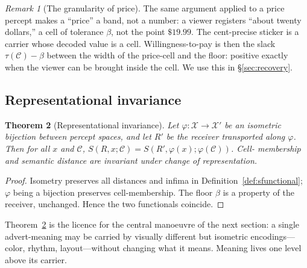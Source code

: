 \documentclass[twocolumn,11pt,a4paper]{article}
\theoremstyle{adv}
\newtheorem{theorem}{Theorem}[section]
\theoremstyle{definition}
\theoremstyle{remark}
\newtheorem{remark}[theorem]{Remark}
\newcommand{\Out}{\mathcal{X}}         %
\newcommand{\Cell}{\mathcal{C}}        %
\newcommand{\Recv}{R}                  %
\newcommand{\Sval}{S}                  %
\newcommand{\floor}{\beta}            %
\newcommand{\tol}{\tau}               %
\begin{document}
\begin{remark}[The granularity of price]
\label{rem:price}
The same argument applied to a price percept makes a ``price'' a band, not
a number: a viewer registers ``about twenty dollars,'' a cell of tolerance
$\floor$, not the point $\$19.99$. The cent-precise sticker is a carrier
whose decoded value is a cell. Willingness-to-pay is then the slack
$\tol(\Cell)-\floor$ between the width of the price-cell and the floor:
positive exactly when the viewer can be brought inside the cell. We use
this in \S\ref{sec:recovery}.
\end{remark}

\subsection{Representational invariance}

\begin{theorem}[Representational invariance]
\label{thm:repinv}
Let $\varphi:\Out\to\Out'$ be an isometric bijection between percept
spaces, and let $\Recv'$ be the receiver transported along $\varphi$. Then
for all $x$ and $\Cell$,
$\Sval(\Recv,x;\Cell)=\Sval(\Recv',\varphi(x);\varphi(\Cell))$. Cell-
membership and semantic distance are invariant under change of
representation.
\end{theorem}

\begin{proof}
Isometry preserves all distances and infima in
Definition~\ref{def:sfunctional}; $\varphi$ being a bijection preserves
cell-membership. The floor $\floor$ is a property of the receiver,
unchanged. Hence the two functionals coincide.
\end{proof}

Theorem~\ref{thm:repinv} is the licence for the central manoeuvre of the
next section: a single advert-meaning may be carried by visually different
but isometric encodings---color, rhythm, layout---without changing what it
means. Meaning lives one level above its carrier.
\end{document}
